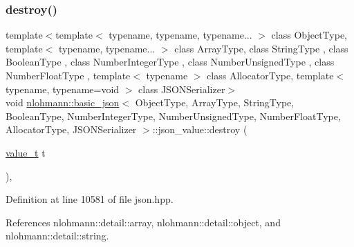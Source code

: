 \subsubsection{\texorpdfstring{destroy()}{destroy()}}
{\footnotesize\ttfamily template$<$template$<$ typename, typename, typename... $>$ class Object\+Type, template$<$ typename, typename... $>$ class Array\+Type, class String\+Type , class Boolean\+Type , class Number\+Integer\+Type , class Number\+Unsigned\+Type , class Number\+Float\+Type , template$<$ typename $>$ class Allocator\+Type, template$<$ typename, typename=void $>$ class J\+S\+O\+N\+Serializer$>$ \\
void \hyperlink{classnlohmann_1_1basic__json}{nlohmann\+::basic\+\_\+json}$<$ Object\+Type, Array\+Type, String\+Type, Boolean\+Type, Number\+Integer\+Type, Number\+Unsigned\+Type, Number\+Float\+Type, Allocator\+Type, J\+S\+O\+N\+Serializer $>$\+::json\+\_\+value\+::destroy (\begin{DoxyParamCaption}\item[{\hyperlink{namespacenlohmann_1_1detail_a1ed8fc6239da25abcaf681d30ace4985}{value\+\_\+t}}]{t }\end{DoxyParamCaption})\hspace{0.3cm}{\ttfamily [inline]}, {\ttfamily [noexcept]}}



Definition at line 10581 of file json.\+hpp.



References nlohmann\+::detail\+::array, nlohmann\+::detail\+::object, and nlohmann\+::detail\+::string.


